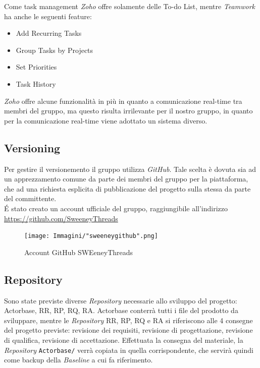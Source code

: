 \documentclass[a4paper]{report}
\begin{document}
	Come task management \emph{Zoho} offre solamente delle To-do List, mentre \emph{Teamwork} ha anche le seguenti
	feature:
	\begin{itemize}
		\item Add Recurring Tasks
		\item Group Tasks by Projects
		\item Set Priorities
		\item Task History
	\end{itemize}
	\emph{Zoho} offre alcune funzionalità in più in quanto a comunicazione real-time tra membri del gruppo,
	ma questo risulta irrilevante per il nostro gruppo, in quanto per la comunicazione real-time viene
	adottato un sistema diverso.
	\subsection{Versioning}
	Per gestire il versionemento il gruppo utilizza \emph{GitHub}. Tale scelta è dovuta sia ad un apprezzamento
	comune da parte dei membri del gruppo per la piattaforma, che ad una richiesta esplicita di pubblicazione del 
	progetto sulla stessa da parte del committente. \\
	\'E stato creato un account ufficiale del gruppo, raggiungibile all'indirizzo 
	\url{https://github.com/SweeneyThreads}
	\begin{figure}[h!]
		\centering
		\texttt{[image: Immagini/"sweeneygithub".png]}
		\caption{Account GitHub SWEeneyThreads}
	\end{figure}
	\subsection{Repository}
	Sono state previste diverse \emph{Repository} necessarie allo sviluppo del progetto: Actorbase, RR, RP, RQ, RA. 
	Actorbase conterrà tutti i file del prodotto da sviluppare, mentre le \emph{Repository} RR, RP, RQ e RA si riferiscono 
	alle 4 consegne del progetto previste: revisione dei requisiti, revisione di progettazione, revisione di qualifica, 
	revisione di accettazione. Effettuata la consegna del materiale, la \emph{Repository} \verb|Actorbase/| verrà copiata 
	in quella corrispondente, che servirà quindi come backup della \emph{Baseline} a cui fa riferimento.
	
\end{document}
